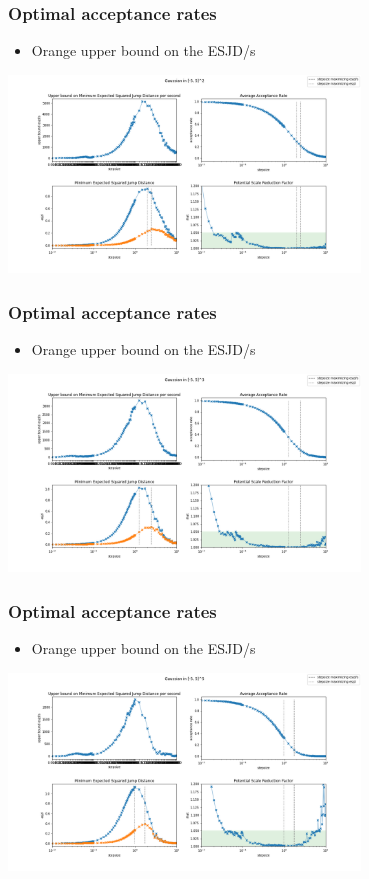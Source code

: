 \begin{frame}[t]
    \frametitle{Optimal acceptance rates}
    \begin{itemize}
    \item {\color{orange} Orange } upper bound on the ESJD/s
    \end{itemize}
    \centering
    \includegraphics[width=0.7\textwidth]{imgs/bound-5-dim-2-Gaussian-results.png}
\end{frame}

\begin{frame}[t]
    \frametitle{Optimal acceptance rates}
    \begin{itemize}
    \item {\color{orange} Orange } upper bound on the ESJD/s
    \end{itemize}
    \centering
    \includegraphics[width=0.7\textwidth]{imgs/bound-5-dim-3-Gaussian-results.png}
\end{frame}

\begin{frame}[t]
    \frametitle{Optimal acceptance rates}
    \begin{itemize}
    \item {\color{orange} Orange } upper bound on the ESJD/s
    \end{itemize}
    \centering
    \includegraphics[width=0.7\textwidth]{imgs/bound-5-dim-5-Gaussian-results.png}
\end{frame}


